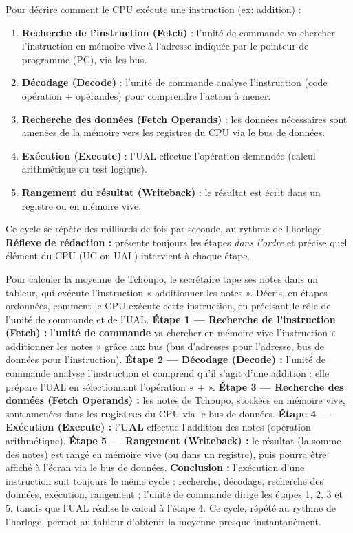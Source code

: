 \documentclass[11pt]{article}
\newcommand{\cle}[1]{{\popxbold\color{popdark}#1}}
\begin{document}
\begin{methode}
Pour décrire comment le CPU exécute une instruction (ex: addition) :
\begin{enumerate}
\item \textbf{Recherche de l'instruction (Fetch)} : l'unité de commande va chercher l'instruction en mémoire vive à l'adresse indiquée par le pointeur de programme (PC), via les bus.
\item \textbf{Décodage (Decode)} : l'unité de commande analyse l'instruction (code opération + opérandes) pour comprendre l'action à mener.
\item \textbf{Recherche des données (Fetch Operands)} : les données nécessaires sont amenées de la mémoire vers les registres du CPU via le bus de données.
\item \textbf{Exécution (Execute)} : l'UAL effectue l'opération demandée (calcul arithmétique ou test logique).
\item \textbf{Rangement du résultat (Writeback)} : le résultat est écrit dans un registre ou en mémoire vive.
\end{enumerate}
Ce cycle se répète des milliards de fois par seconde, au rythme de l'\cle{horloge}.
\textbf{Réflexe de rédaction :} présente toujours les étapes \emph{dans l'ordre} et précise quel élément du CPU (UC ou UAL) intervient à chaque étape.
\end{methode}

\begin{exoresolu}
Pour calculer la moyenne de Tchoupo, le secrétaire tape ses notes dans un tableur, qui exécute l'instruction « additionner les notes ». Décris, en étapes ordonnées, comment le CPU exécute cette instruction, en précisant le rôle de l'unité de commande et de l'UAL.
\tcblower
\textbf{Étape 1 — Recherche de l'instruction (Fetch) :} l'\textbf{unité de commande} va chercher en mémoire vive l'instruction « additionner les notes » grâce aux bus (bus d'adresses pour l'adresse, bus de données pour l'instruction).
\textbf{Étape 2 — Décodage (Decode) :} l'unité de commande analyse l'instruction et comprend qu'il s'agit d'une addition : elle prépare l'UAL en sélectionnant l'opération « + ».
\textbf{Étape 3 — Recherche des données (Fetch Operands) :} les notes de Tchoupo, stockées en mémoire vive, sont amenées dans les \textbf{registres} du CPU via le bus de données.
\textbf{Étape 4 — Exécution (Execute) :} l'\textbf{UAL} effectue l'addition des notes (opération arithmétique).
\textbf{Étape 5 — Rangement (Writeback) :} le résultat (la somme des notes) est rangé en mémoire vive (ou dans un registre), puis pourra être affiché à l'écran via le bus de données.
\textbf{Conclusion :} l'exécution d'une instruction suit toujours le même cycle : recherche, décodage, recherche des données, exécution, rangement ; l'unité de commande dirige les étapes 1, 2, 3 et 5, tandis que l'UAL réalise le calcul à l'étape 4. Ce cycle, répété au rythme de l'horloge, permet au tableur d'obtenir la moyenne presque instantanément.
\end{exoresolu}
\end{document}
